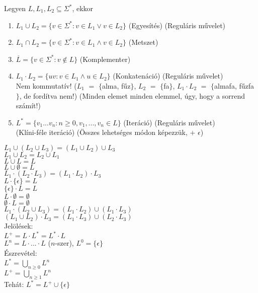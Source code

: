 \begin{frame}
\begin{tcolorbox}[squeezed title={Def.: Egyesítés,Metszet, Komplementer, Konkatenáció, Iteráció}]
Legyen $L, L_1, L_2 \subseteq {\Sigma}^*$, ekkor\\
\mmedskip
\begin{enumerate}
\item $L_1 \cup L_2 = \{v \in {\Sigma}^* : v \in L_1 \lor v \in L_2\}$ (Egyesítés) (Reguláris művelet)
\item $L_1 \cap L_2 = \{v \in {\Sigma}^* : v \in L_1 \land v \in L_2\}$ (Metszet)
\item $\overline{L} = \{v \in {\Sigma}^* : v \notin L\}$ (Komplementer)
\item $L_1 \cdot  L_2 = \{uv : v \in L_1 \land u \in L_2\}$ (Konkatenáció) (Reguláris művelet)\\
Nem kommutatív! ($L_1$ $=$ $\{$alma, fűz$\}$, $L_2$ $=$ $\{$fa$\}$, $L_1 \cdot L_2$ $=$ $\{$almafa, fűzfa$\}$, de fordítva nem!) (Minden elemet minden elemmel, úgy, hogy a sorrend számít!)
\item $L^* = \{v_1...v_n : n \geq 0, v_1, ..., v_n \in L\}$ (Iteráció) (Reguláris művelet)\\
(Klíni-féle iteráció) (Összes lehetséges módon képezzük, + $\epsilon$)
\end{enumerate}
\end{tcolorbox}

\end{frame}

\begin{frame}
\begin{tcolorbox}[title={Műveleti azonosságok}]
$L_1 \cup (L_2 \cup L_3) = (L_1 \cup L_2) \cup L_3$\\
$L_1 \cup L_2 = L_2  \cup L_1$\\
$L \cup L = L$\\
$L \cup \emptyset = L$\\
\mbigskip
$L_1 \cdot (L_2 \cdot L_3) = (L_1 \cdot L_2) \cdot L_3$\\
$L \cdot \{{\epsilon}\} = L$\\
$\{{\epsilon}\} \cdot L = L$\\
$L \cdot \emptyset = \emptyset$\\
$\emptyset \cdot L = \emptyset$\\
\mbigskip
$L_1 \cdot (L_2 \cup L_3) = (L_1 \cdot L_2) \cup (L_1 \cdot L_3)$\\
$(L_1 \cup L_2) \cdot L_3 = (L_1 \cdot L_3) \cup (L_2 \cdot L_3)$\\
\mbigskip
Jelölések:\\
\mmedskip
$L^+ = L \cdot L^* = L^* \cdot L$\\
$L^n = L \cdot ... \cdot L$ ($n$-szer), $L^0 = \{{\epsilon}\}$\\
\mmedskip
Észrevétel:\\
\mmedskip
$L^* = \bigcup_{n \geq 0} L^n$\\
$L^+ = \bigcup_{n \geq 1} L^n$\\
\msmallskip
Tehát: $L^* = L^+ \cup \{{\epsilon}\}$
\end{tcolorbox}

\end{frame}

